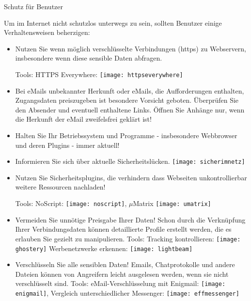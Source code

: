 \documentclass[final]{beamer}
\newlength{\twocolwid}
\begin{document}
\begin{frame}[t]
\begin{columns}[t]
\begin{column}{\twocolwid}
\begin{alertblock}{Schutz für Benutzer}
\small{
Um im Internet nicht schutzlos unterwegs zu sein, sollten Benutzer einige Verhaltensweisen
beherzigen:

\begin{itemize}
 \item Nutzen Sie wenn möglich verschlüsselte Verbindungen (https) zu Webservern, insbesondere
 wenn diese sensible Daten abfragen.\par
 Tools: 
 HTTPS Everywhere: \texttt{[image: httpseverywhere]}

 \item Bei eMails unbekannter Herkunft oder eMails, die Aufforderungen enthalten, Zugangsdaten
 preiszugeben ist besondere Vorsicht geboten. Überprüfen Sie den Absender und eventuell enthaltene
 Links. Öffnen Sie Anhänge nur, wenn die Herkunft der eMail zweifelsfrei geklärt ist!
 
 \item Halten Sie Ihr Betriebssystem und Programme - insbesondere Webbrowser und deren Plugins - 
 immer aktuell!
 
 \item Informieren Sie sich über aktuelle Sicherheitslücken. 
 \texttt{[image: sicherimnetz]}
 
 \item Nutzen Sie Sicherheitsplugins, die verhindern dass Webseiten unkontrollierbar weitere
 Ressourcen nachladen! \par
 Tools: 
 NoScript: \texttt{[image: noscript]}, 
 $\mu{}$Matrix \texttt{[image: umatrix]}

 \item Vermeiden Sie unnötige Preisgabe Ihrer Daten! Schon durch die Verknüpfung Ihrer 
 Verbindungsdaten können detaillierte Profile erstellt werden, die es erlauben Sie gezielt zu 
 manipulieren.
 Tools:
 Tracking kontrollieren: \texttt{[image: ghostery]}
 Werbenetzwerke erkennen: \texttt{[image: lightbeam]}
 
 \item Verschlüsseln Sie alle sensiblen Daten! Emails, Chatprotokolle und andere Dateien können
 von Angreifern leicht ausgelesen werden, wenn sie nicht verschlüsselt sind. 
 Tools: 
 eMail-Verschlüsselung mit Enigmail: \texttt{[image: enigmail]},
 Vergleich unterschiedlicher Messenger: \texttt{[image: effmessenger]}
 

\end{itemize}}
\end{alertblock}
\end{column}
\end{columns}
\end{frame}
\end{document}
